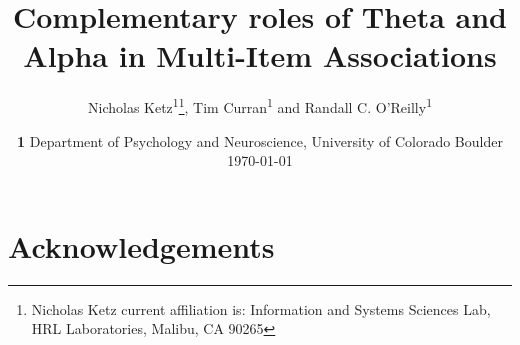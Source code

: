 \documentclass[11pt, titlepage, twoside]{article}
\begin{document}
\title{Complementary roles of Theta and Alpha in Multi-Item Associations}
\author{Nicholas Ketz\textsuperscript{1}\footnote{Nicholas Ketz current affiliation is: Information and Systems Sciences Lab, HRL Laboratories, Malibu, CA 90265}, Tim Curran\textsuperscript{1} and Randall C. O'Reilly\textsuperscript{1}}
\date{
	\textbf{1} Department of Psychology and Neuroscience, University of Colorado Boulder  
	 \\
	\today
}

\maketitle


\section*{Acknowledgements}\label{sec:acknowledge}
\end{document}
